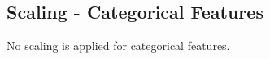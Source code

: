 \documentclass{article}
\begin{document}
\subsection{Scaling - Categorical Features}
No scaling is applied for categorical features.







\end{document}
